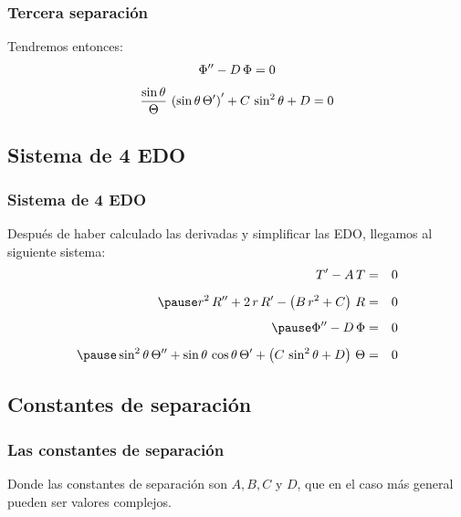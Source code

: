 \documentclass[12pt]{beamer}
\begin{document}
\begin{frame}
\frametitle{Tercera separación}
Tendremos entonces:
\begin{align}
{\Phi}^{\prime \prime} - D \, \Phi = 0
\label{eq:ecuacion_02_298}
\end{align}
\begin{align}
\dfrac{\sin \theta}{\Theta} \, \left( \sin \theta \, {\Theta}^{\prime} \right)^{\prime} + C \, \sin^{2} \theta + D = 0
\label{eq:ecuacion_02_299}
\end{align}
\end{frame}
\subsection{Sistema de 4 EDO}
\begin{frame}
\frametitle{Sistema de 4 EDO}
Después de haber calculado las derivadas y simplificar las EDO, llegamos al siguiente sistema:
\fontsize{12}{12}\selectfont
\begin{eqnarray}
\pderivada{T} - A \, T &=&0 \label{eq:ecuacion_02_300} \\[0.5em] \pause
r^{2} \, \sderivada{R} + 2 \, r \, \pderivada{R} - \left( B \, r^{2} + C \right) \, R &=& 0 \label{eq:ecuacion_02_301} \\[0.5em] \pause
\sderivada{\Phi} - D \, \Phi &=& 0 \label{eq:ecuacion_02_302} \\[0.5em] \pause
\sin^{2} \theta \, \sderivada{\Theta} + \sin \theta \, \cos \theta \, \pderivada{\Theta} + \left( C \, \sin^{2} \theta + D \right) \, \Theta &=& 0 \label{eq:ecuacion_02_303}
\end{eqnarray}
\end{frame}
\subsection*{Constantes de separación}
\begin{frame}
\frametitle{Las constantes de separación}
Donde las constantes de separación son $A, B, C$ y $D$, que en el caso más general pueden ser valores complejos.
\end{frame}
\end{document}
